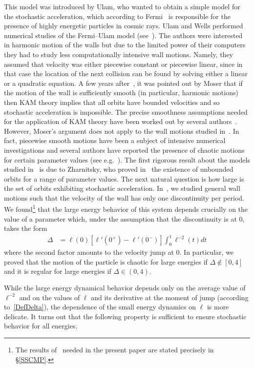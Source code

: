 \documentclass[AHL, Unicode, longabstracts,published]{cedram}
\begin{document}
This model was introduced by Ulam, who wanted to obtain a simple model for the stochastic acceleration, which according to Fermi~\cite{F49, F54} is responsible for the presence of highly energetic particles in cosmic rays. Ulam and Wells performed numerical studies of the Fermi--Ulam model (see~\cite{U}). The authors were interested in harmonic motion of the walls but due to the limited power of their computers they had to study less computationally intensive wall motions. Namely, they assumed that velocity was either piecewise constant or piecewise linear, since in that case the location of the next collision can be found by solving either a linear or a quadratic equation. A few years after~\cite{U}, it was pointed out by Moser that if the motion of the wall is sufficiently smooth (in particular, harmonic motions) then KAM theory implies that all orbits have bounded velocities and so stochastic acceleration is impossible. The precise smoothness assumptions needed for the application of KAM theory have been worked out by several authors~\cite{Do, LL, P2, P1}. However, Moser's argument does not apply to the wall motions studied in~\cite{U}. In fact, piecewise smooth motions have been a subject of intensive numerical investigations and several authors have reported the presence of chaotic motions for certain parameter values (see e.g.~\cite{Br, CZ}). The first rigorous result about the models studied in~\cite{U} is due to Zharnitsky, who proved in~\cite{Z} the existence of unbounded orbits for a range of parameter values. The next natural question is how large is the set of orbits exhibiting stochastic acceleration. In~\cite{fum}, we studied general wall motions such that the velocity of the wall has only one discontinuity per period. We found\footnote{The results of~\cite{fum} needed in the present paper are stated precisely in \S\ref{SSCMP}.} that the large energy behavior of this system depends crucially on the value of a parameter which, under the assumption that the discontinuity is at $0$, takes the form
\begin{align}\label{DefDelta}
\Delta &= \ell(0) \left[\ell'(0^{+})-\ell'(0^{-})\right] \int_0^1 \ell^{-2}(t) dt
\end{align}
where the second factor amounts to the velocity jump at $0$. In particular, we proved that the motion of the particle is chaotic for large energies if $\Delta\not\in[0,4]$ and it is regular for large energies if $\Delta\in(0,4)$.

While the large energy dynamical behavior depends only on the average value of $\ell^{-2}$ and on the values of $\ell$ and its derivative at the moment of jump (according to~\eqref{DefDelta}), the dependence of the small energy dynamics on $\ell$ is more delicate. It turns out that the following property is sufficient to ensure stochastic behavior for all energies.
\end{document}
